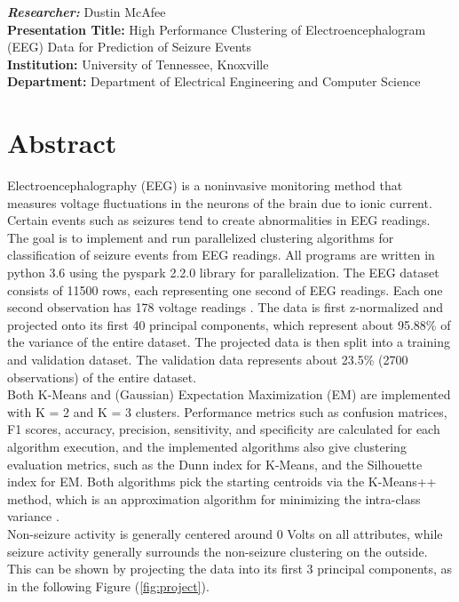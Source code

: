 \documentclass[tikz]{article}
\begin{document}
\singlespacing

\noindent
\textit{\textbf{Researcher:}} Dustin McAfee \\
\textbf{Presentation Title:} High Performance Clustering of Electroencephalogram (EEG) Data for Prediction of Seizure Events \\
\textbf{Institution:} University of Tennessee, Knoxville \\
\textbf{Department:} Department of Electrical Engineering and Computer Science 

\section*{Abstract}
Electroencephalography (EEG) is a noninvasive monitoring method that measures voltage fluctuations in the neurons of the brain due to ionic current. Certain events such as seizures tend to create abnormalities in EEG readings. The goal is to implement and run parallelized clustering algorithms for classification of seizure events from EEG readings. All programs are written in python 3.6 using the pyspark 2.2.0 library for parallelization. The EEG dataset consists of 11500 rows, each representing one second of EEG readings. Each one second observation has 178 voltage readings \cite{data}. The data is first z-normalized and projected onto its first 40 principal components, which represent about 95.88\% of the variance of the entire dataset. The projected data is then split into a training and validation dataset. The validation data represents about 23.5\% (2700 observations) of the entire dataset. \\

Both K-Means and (Gaussian) Expectation Maximization (EM) are implemented with K = 2 and K = 3 clusters. Performance metrics such as confusion matrices, F1 scores, accuracy, precision, sensitivity, and specificity are calculated for each algorithm execution, and the implemented algorithms also give clustering evaluation metrics, such as the Dunn index for K-Means, and the Silhouette index for EM. Both algorithms pick the starting centroids via the K-Means++ method, which is an approximation algorithm for minimizing the intra-class variance \cite{kmeans++}. \\

Non-seizure activity is generally centered around 0 Volts on all attributes, while seizure activity generally surrounds the non-seizure clustering on the outside. This can be shown by projecting the data into its first 3 principal components, as in the following Figure (\ref{fig:project}).
\end{document}
